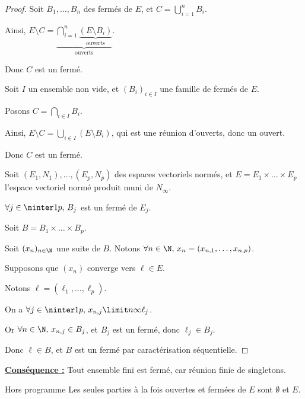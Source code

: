 \begin{proof}
    Soit $B_1, \dots, B_n$ des fermés de $E$, et $\displaystyle C = \bigcup_{i=1}^n B_i$.

    Ainsi, $E \setminus C = \underbrace{\bigcap_{i=1}^n \underbrace{(E \setminus B_i)}_{\text{ouverts}}}_{\text{ouverts}}$.

    Donc $C$ est un fermé.

    \lvspace Soit $I$ un ensemble non vide, et $(B_i)_{i \in I}$ une famille de fermés de $E$.

    Posons $\displaystyle C = \bigcap_{i \in I} B_i$.

    Ainsi, $\displaystyle E \setminus C = \bigcup_{i \in I} (E \setminus B_i)$, qui est une réunion d'ouverts, donc un ouvert.

    Donc $C$ est un fermé.

    \lvspace Soit $(E_1, N_1), \dots, (E_p, N_p)$ des espaces vectoriels normés, et
    $E = E_1 \times \dots \times E_p$ l'espace vectoriel normé produit muni de $N_\infty$.

    $\forall j \in \ninter 1 p, \, B_j$ est un fermé de $E_j$.

    Soit $B = B_1 \times \dots \times B_p$. 

    Soit $(x_n)_{n \in \N}$ une suite de $B$. Notons $\forall n \in \N, \, x_n = (x_{n, 1}, \dots, x_{n, p})$.

    Supposons que $(x_n)$ converge vers $\ell \in E$. 

    Notons $\ell = (\ell_1, \dots, \ell_p)$.

    On a $\forall j \in \ninter 1 p, \, x_{n, j} \limit n \infty \ell_j$.

    Or $\forall n \in \N, \, x_{n, j} \in B_j$, et $B_j$ est un fermé, donc $\ell_j \in B_j$.

    Donc $\ell \in B$, et $B$ est un fermé par caractérisation séquentielle.

\end{proof}


\textbf{\uline{Conséquence :}}
Tout ensemble fini est fermé, car réunion finie de singletons.

\begin{theoreme}{Hors programme}{}
    Les seules parties à la fois ouvertes et fermées de $E$ sont $\emptyset$ et $E$.
\end{theoreme}

